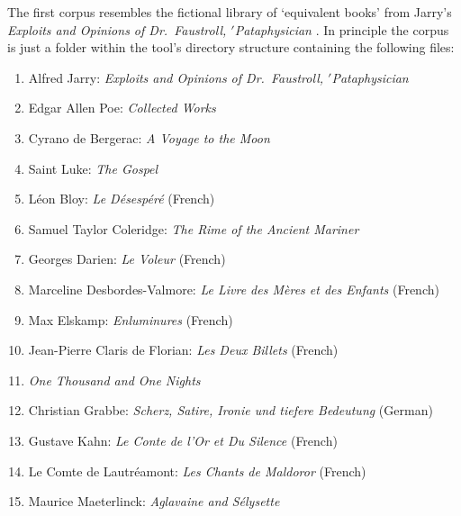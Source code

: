The first corpus resembles the fictional library of `equivalent books' from Jarry's \textit{Exploits and Opinions of Dr.\ Faustroll, $'$Pataphysician} \autocite*{Jarry1996}. In principle the corpus is just a folder within the tool's directory structure containing the following files:


\begin{enumerate}[start=0]
\item Alfred Jarry: \textit{Exploits and Opinions of Dr.\ Faustroll, $'$Pataphysician} \autocite*{Jarry1996}
\item Edgar Allen Poe: \textit{Collected Works} \autocite*{Poe2008}
\item Cyrano de Bergerac: \textit{A Voyage to the Moon} \autocite*{Bergerac2014}
\item Saint Luke: \textit{The Gospel} \autocite*{Bergerac2014}
\item L{\'e}on Bloy: \textit{Le D{\'e}sesp{\'e}r{\'e}} (French) \autocite*{Bloy2011}
\item Samuel Taylor Coleridge: \textit{The Rime of the Ancient Mariner} \autocite*{Coleridge2013}
\item Georges Darien: \textit{Le Voleur} (French) \autocite*{Darien2005}
\item Marceline Desbordes-Valmore: \textit{Le Livre des M{\`e}res et des Enfants} (French) \autocite*{Desbordes2004}
\item Max Elskamp: \textit{Enluminures} (French) \autocite*{Elskamp1898}
\item Jean-Pierre Claris de Florian: \textit{Les Deux Billets} (French) \autocite*{Florian2012}
\item \textit{One Thousand and One Nights} \autocite{Lang2008}
\item Christian Grabbe: \textit{Scherz, Satire, Ironie und tiefere Bedeutung} (German) \autocite*{Grabbe1995}
\item Gustave Kahn: \textit{Le Conte de l'Or et Du Silence} (French) \autocite*{Kahn2016}
\item Le Comte de Lautr{\'e}amont: \textit{Les Chants de Maldoror} (French) \autocite*{Lautreamont2011}
\item Maurice Maeterlinck: \textit{Aglavaine and S{\'e}lysette} \autocite*{Maeterlinck1918}

\end{enumerate}

